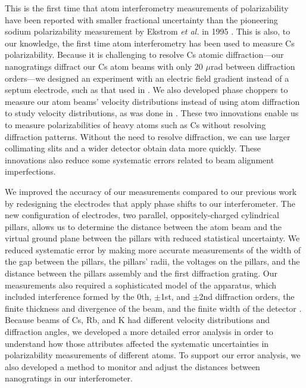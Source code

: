 \documentclass[twocolumn,prl,showpacs,superscriptaddress,longbibliography]{revtex4-1}   %
\newcommand{\etalspace}{\textit{et al. }}
\begin{document}
This is the first time that atom interferometry measurements of polarizability have been reported with smaller fractional uncertainty than the pioneering sodium polarizability measurement by Ekstrom \etalspace in 1995 \cite{Ekstrom1995}.
This is also, to our knowledge, the first time atom interferometry has been used to measure Cs polarizability.
Because it is challenging to resolve Cs atomic diffraction---our nanogratings diffract our Cs atom beams with only 20 $\mu$rad between diffraction orders---we designed an experiment 
with an electric field gradient instead of a septum electrode, such as that used in \cite{Ekstrom1995,Miffre2006}.
We also developed phase choppers \cite{Roberts2002,Roberts2004,Holmgren2011,Hromada2014} to measure our atom beams' velocity distributions instead of 
using atom diffraction to study velocity distributions, as was done in \cite{Ekstrom1995,Holmgren2010}.
These two innovations enable us to measure polarizabilities of heavy atoms such as Cs without resolving diffraction patterns. 
Without the need to resolve diffraction, we can use larger collimating slits and a wider detector obtain data more quickly. These innovations also reduce some systematic errors related to beam alignment imperfections.

We improved the accuracy of our measurements compared to our previous work \cite{Holmgren2010} by redesigning the electrodes that apply phase shifts to our interferometer. 
The new configuration of electrodes, two parallel, oppositely-charged cylindrical pillars, allows us to determine the distance between the atom beam and the virtual ground plane between the pillars with reduced statistical uncertainty. We reduced systematic error by making more accurate measurements of the width of the gap between the pillars, the pillars' radii, the voltages on the pillars, and the distance between the pillars assembly and the first diffraction grating.
Our measurements also required a sophisticated model of the apparatus, which included
interference formed by the 0th, $\pm$1st, and $\pm$2nd diffraction orders, the finite thickness and divergence of the beam, and the finite width of the detector \cite{Hromada2014}.
Because beams of Cs, Rb, and K had different velocity distributions and diffraction angles, we developed a more detailed error analysis in order to understand how those attributes affected the systematic uncertainties in polarizability measurements of different atoms.
To support our error analysis, we also developed a method to monitor and adjust the distances between nanogratings in our interferometer.
\end{document}
